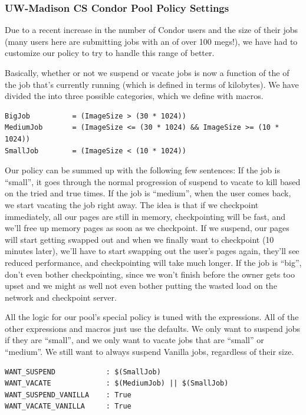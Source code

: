 \subsubsection{\label{sec:UW-Policy}
UW-Madison CS Condor Pool Policy Settings} 

Due to a recent increase in the number of Condor users and the size of
their jobs (many users here are submitting jobs with an
 of over 100 megs!), we have had to customize our
policy to try to handle this range of  better.

Basically, whether or not we suspend or vacate jobs is now a function
of the  of the job that's currently running (which is
defined in terms of kilobytes).  We have divided the 
into three possible categories, which we define with macros.
\begin{verbatim}
BigJob          = (ImageSize > (30 * 1024))
MediumJob       = (ImageSize <= (30 * 1024) && ImageSize >= (10 * 1024))
SmallJob        = (ImageSize < (10 * 1024))
\end{verbatim}

Our policy can be summed up with the following few sentences: If the
job is ``small'', it goes through the normal progression of suspend to
vacate to kill based on the tried and true times.  If the job is
``medium'', when the user comes back, we start vacating the job right
away.  The idea is that if we checkpoint immediately, all our pages
are still in memory, checkpointing will be fast, and we'll free up
memory pages as soon as we checkpoint.  If we suspend, our pages will
start getting swapped out and when we finally want to checkpoint (10
minutes later), we'll have to start swapping out the user's pages
again, they'll see reduced performance, and checkpointing will take
much longer.  If the job is ``big'', don't even bother checkpointing,
since we won't finish before the owner gets too upset and we might as
well not even bother putting the wasted load on the network and
checkpoint server.

All the logic for our pool's special policy is tuned with the
 expressions. 
All of the other expressions and macros just use the defaults.
We only want to suspend jobs if they are ``small'', and we only want
to vacate jobs that are ``small'' or ``medium''.  
We still want to always suspend Vanilla jobs, regardless of their
size.
\begin{verbatim}
WANT_SUSPEND            : $(SmallJob)
WANT_VACATE             : $(MediumJob) || $(SmallJob)
WANT_SUSPEND_VANILLA    : True
WANT_VACATE_VANILLA     : True
\end{verbatim}

